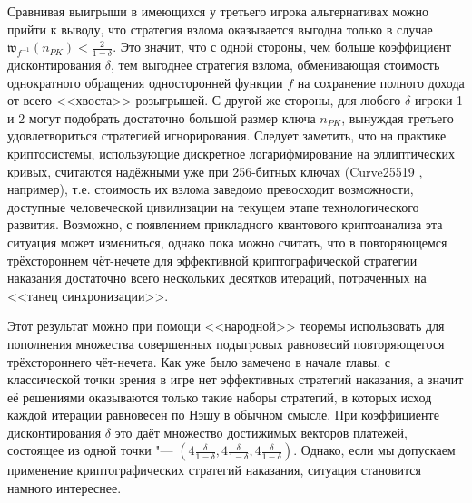 Сравнивая выигрыши в имеющихся у третьего игрока альтернативах можно прийти к выводу, что стратегия взлома оказывается выгодна только в случае $\mathfrak{w}_{f^{-1}}(n_{PK}) < \frac{2}{1 - \delta}$. Это значит, что с одной стороны, чем больше коэффициент дисконтирования $\delta$, тем выгоднее стратегия взлома, обменивающая стоимость однократного обращения односторонней функции $f$ на сохранение полного дохода от всего <<хвоста>> розыгрышей. С другой же стороны, для любого $\delta$ игроки 1 и 2 могут подобрать достаточно большой размер ключа $n_{PK}$, вынуждая третьего удовлетвориться стратегией игнорирования. Следует заметить, что на практике криптосистемы, использующие дискретное логарифмирование на эллиптических кривых, считаются надёжными уже при 256-битных ключах (Curve25519 \cite{Bernstein}, например), т.е. стоимость их взлома заведомо превосходит возможности, доступные человеческой цивилизации на текущем этапе технологического развития. Возможно, с появлением прикладного квантового криптоанализа эта ситуация может измениться, однако пока можно считать, что в повторяющемся трёхстороннем чёт-нечете для эффективной криптографической стратегии наказания достаточно всего нескольких десятков итераций, потраченных на <<танец синхронизации>>. 

Этот результат можно при помощи <<народной>> теоремы использовать для пополнения множества совершенных подыгровых равновесий повторяющегося трёхстороннего чёт-нечета. Как уже было замечено в начале главы, с классической точки зрения в игре нет эффективных стратегий наказания, а значит её решениями оказываются только такие наборы стратегий, в которых исход каждой итерации равновесен по Нэшу в обычном смысле. При коэффициенте дисконтирования $\delta$ это даёт множество достижимых векторов платежей, состоящее из одной точки "--- $(4 \frac{\delta}{1-\delta}, 4 \frac{\delta}{1-\delta}, 4 \frac{\delta}{1-\delta})$. Однако, если мы допускаем применение криптографических стратегий наказания, ситуация становится намного интереснее.

